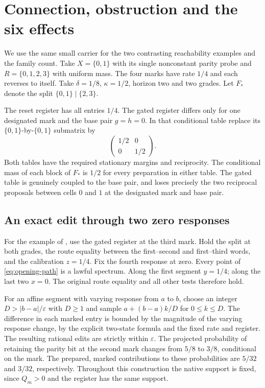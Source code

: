 \section{Connection, obstruction and the six effects}\label{sec:two-examples}

We use the same small carrier for the two contrasting reachability
examples and the family count. Take \(X=\{0,1\}\) with its single
nonconstant parity probe and \(R=\{0,1,2,3\}\) with uniform mass.
The four marks have rate \(1/4\) and each reverses to itself.
Take \(\delta=1/8\), \(\kappa=1/2\), horizon two and two grades.
Let \(F_*\) denote the split \(\{0,1\}\mid\{2,3\}\).

The reset register has all entries \(1/4\). The gated register differs
only for one designated mark and the base pair \(g=h=0\). In that
conditional table replace its \(\{0,1\}\)-by-\(\{0,1\}\) submatrix by
\[
 \begin{pmatrix} 1/2 & 0\\ 0&1/2\end{pmatrix}.
\]
Both tables have the required stationary margins and reciprocity.
The conditional mass of each block of \(F_*\) is \(1/2\) for every
preparation in either table. The gated table is genuinely coupled to
the base pair, and loses precisely the two reciprocal proposals
between cells \(0\) and \(1\) at the designated mark and base pair.

\subsection{An exact edit through two zero responses}\label{sec:staged}

For the example of , use the gated register
at the third mark. Hold the split at both grades, the route equality
between the first--second and first--third words, and the calibration
\(z=1/4\). Fix the fourth response at zero. Every point of
\eqref{eq:opening-path} is a lawful spectrum. Along the first segment
\(y=1/4\); along the last two \(x=0\).
The original route equality and all other tests therefore hold.

For an affine segment with varying response from \(a\) to \(b\),
choose an integer \(D>|b-a|/\varepsilon\) with \(D\ge1\) and sample
\(a+(b-a)k/D\) for \(0\le k\le D\). The difference in each marked
entry is bounded by the magnitude of the varying response change,
by the explicit two-state formula and the fixed rate and register.
The resulting rational edits are strictly within \(\varepsilon\).
The projected probability of retaining the parity bit at the
second mark changes from \(5/8\) to \(3/8\), conditional on the mark.
The prepared, marked contributions to these probabilities are
\(5/32\) and \(3/32\), respectively.
Throughout this construction the native support is fixed, since
\(Q_m>0\) and the register has the same support.

